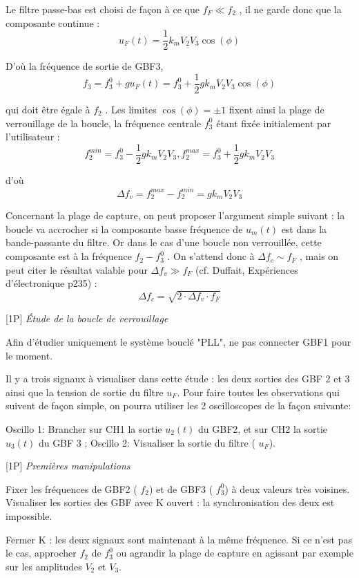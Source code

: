 \documentclass{article}%
\begin{document}
Le filtre passe-bas est choisi de façon à ce que $f_F \ll f_2$ , il ne garde donc que la composante continue :
\[ u_F(t) = \frac{1}{2}k_m V_{2} V_{3} \cos(\phi)\]

D'où la fréquence de sortie de GBF3,
\[ f_3 = f_3^0 + g u_F(t) = f_3^0 + \frac{1}{2} g k_m V_{2} V_{3} \cos(\phi)\]

qui doit être égale à $f_2$ . Les limites $\cos(\phi) = \pm 1$ fixent ainsi la plage de verrouillage de la boucle, la fréquence centrale $f_3^0$ étant fixée initialement par l’utilisateur  :
\[ f_2^{min} = f_3^0 - \frac{1}{2} g k_m V_{2} V_{3} , f_2^{max} = f_3^0 +\frac{1}{2} g k_m V_{2} V_{3}\]

d'où
\[\Delta f_v = f_2^{max} - f_2^{min} =g k_m V_{2} V_{3}\]

Concernant la plage de capture, on peut proposer l'argument simple suivant : la boucle va accrocher si la composante basse fréquence de $u_m(t)$ est dans la bande-passante du filtre. Or dans le cas d'une boucle non verrouillée, cette composante est à la fréquence $f_2 - f_3^0$ . On s'attend donc à $\Delta f_c \sim f_F$ , mais on peut citer le résultat valable pour $\Delta f_v \gg f_F$ (cf. Duffait, Expériences d'électronique p235) :
\[ \Delta f_c = \sqrt{2 \cdot \Delta f_v \cdot f_F}\]

[1P] \textit{Étude de la boucle de verrouillage}

Afin d'étudier uniquement le système bouclé "PLL", ne pas connecter GBF1 pour le moment.

Il y a trois signaux à visualiser dans cette étude : les deux sorties des GBF 2 et 3 ainsi que la tension de sortie du filtre $u_F$. Pour faire toutes les observations qui suivent de façon simple, on pourra utiliser les 2 oscilloscopes de la façon suivante:

    Oscillo 1: Brancher sur CH1 la sortie $u_2(t)$ du GBF2, et sur CH2 la sortie $u_3(t)$ du GBF 3 ;
    Oscillo 2: Visualiser la sortie du filtre ( $u_F$).

    [1P] \textit{Premières manipulations}

    Fixer les fréquences de GBF2 ( $f_2$) et de GBF3 ( $f_3^0$) à deux valeurs très voisines. Visualiser les sorties des GBF avec K ouvert : la synchronisation des deux est impossible.

Fermer K : les deux signaux sont maintenant à la même fréquence. Si ce n'est pas le cas, approcher $f_2$ de $f_3^0$ ou agrandir la plage de capture en agissant par exemple sur les amplitudes $V_{2}$ et $V_{3}$.
\end{document}
